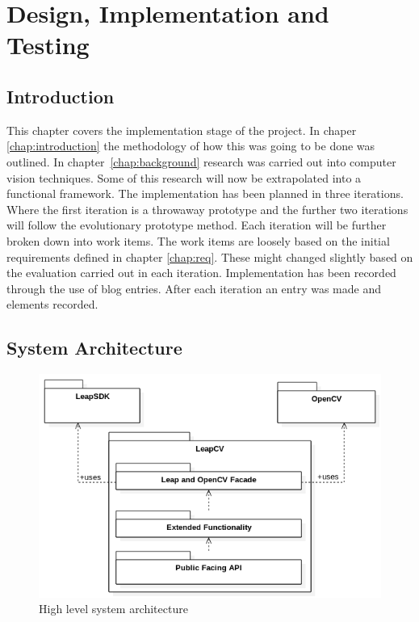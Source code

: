 \documentclass[11pt,oneside]{report}
\begin{document}
	
	\chapter{Design, Implementation and Testing}\label{chap:des&imp}
	\section{Introduction}
	This chapter covers the implementation stage of the project.
	In chaper \ref{chap:introduction} the methodology of how this was going to be done was outlined.
	In chapter~\ref{chap:background} research was carried out into computer vision techniques.
	Some of this research will now be extrapolated into a functional framework.
	The implementation has been planned in three iterations.
	Where the first iteration is a throwaway prototype and the further two iterations will follow the evolutionary prototype method.
	Each iteration will be further broken down into work items.
	The work items are loosely based on the initial requirements defined in chapter \ref{chap:req}.
	These might changed slightly based on the evaluation carried out in each iteration.
	Implementation has been recorded through the use of blog entries.
	After each iteration an entry was made and elements recorded.
	\clearpage
	\section{System Architecture}
	\begin{figure}
			\centering
    			\includegraphics[width=\textwidth]{system_architecture_2}
    			\caption{High level system architecture \protect {\label{fig:system_arch_1}}}

	\end{figure}	
			
\end{document}
